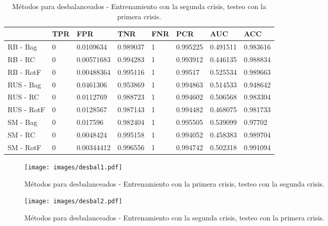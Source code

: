 \documentclass[a4paper,12pt,twoside,oldfontcommands]{memoir}
\begin{document}
	\begin{table}\scriptsize
		\begin{center}
			\begin{tabular}{llllllll}
				\toprule
				{} & TPR &         FPR &       TNR & FNR &       PCR &       AUC &       ACC \\
				\midrule
				RB - Bag                &   0 &   0.0109634 &  0.989037 &   1 &  0.995225 &  0.491511 &  0.983616 \\
				RB - RC       &   0 &  0.00571683 &  0.994283 &   1 &  0.993912 &  0.446135 &  0.988834 \\
				RB - RotF        &   0 &  0.00488364 &  0.995116 &   1 &   0.99517 &  0.525534 &  0.989663 \\
				RUS - Bag          &   0 &   0.0461306 &  0.953869 &   1 &  0.994863 &  0.514533 &  0.948642 \\
				RUS - RC &   0 &   0.0112769 &  0.988723 &   1 &  0.994602 &  0.506568 &  0.983304 \\
				RUS - RotF  &   0 &   0.0128567 &  0.987143 &   1 &  0.994482 &  0.468075 &  0.981733 \\
				SM - Bag                         &   0 &    0.017596 &  0.982404 &   1 &  0.995505 &  0.539099 &   0.97702 \\
				SM - RC                &   0 &   0.0048424 &  0.995158 &   1 &  0.994052 &  0.458383 &  0.989704 \\
				SM - RotF                 &   0 &  0.00344412 &  0.996556 &   1 &  0.994742 &  0.502318 &  0.991094 \\
				\bottomrule
			\end{tabular}
			\caption{Métodos para desbalanceados - Entrenamiento con la segunda crisis, testeo con la primera crisis.}
			\label{tab:crisis2}
		\end{center}
	\end{table}
	
	\begin{figure}
		\centering
		\texttt{[image: images/desbal1.pdf]}
		\caption{Métodos para desbalanceados - Entrenamiento con la primera crisis, testeo con la segunda crisis.}
		\label{fig:crisis1}
	\end{figure}
	
	\begin{figure}
		\centering
		\texttt{[image: images/desbal2.pdf]}
		\caption{Métodos para desbalanceados - Entrenamiento con la segunda crisis, testeo con la primera crisis.}
		\label{fig:crisis2}
	\end{figure}
	
\end{document}
